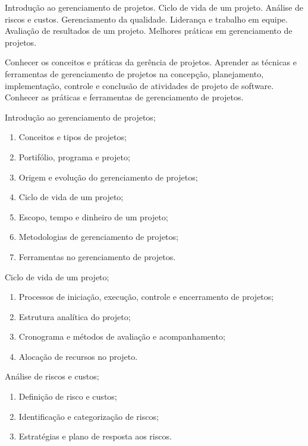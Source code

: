 \begin{pud}

	
	\ementa
	Introdução ao gerenciamento de projetos. Ciclo de vida de um projeto. Análise de riscos e custos. Gerenciamento da qualidade. Liderança e trabalho em equipe. Avaliação de resultados de um projeto. Melhores práticas em gerenciamento de projetos.
	
	\objetivos
	Conhecer os conceitos e práticas da gerência de projetos. Aprender as técnicas e ferramentas de gerenciamento de projetos na concepção, planejamento, implementação, controle e conclusão de atividades de projeto de software.  Conhecer as práticas e ferramentas de gerenciamento de projetos.
	
	
	\programa
	\begin{description}[itemsep=0em]
		\item[UNIDADE I:] Introdução ao gerenciamento de projetos;
		\begin{enumerate}[itemsep=0em, topsep=0em]
			\item Conceitos e tipos de projetos;
			\item Portifólio, programa e projeto;
			\item Origem e evolução do gerenciamento de projetos;
			\item Ciclo de vida de um projeto;
			\item Escopo, tempo e dinheiro de um projeto;
			\item Metodologias de gerenciamento de projetos;
			\item Ferramentas no gerenciamento de projetos.
		\end{enumerate}
		
	    \item[UNIDADE II:] Ciclo de vida de um projeto;
		\begin{enumerate}[itemsep=0em, topsep=0em]
			\item Processos de iniciação, execução, controle e encerramento de projetos;
			\item Estrutura analítica do projeto;
			\item Cronograma e métodos de avaliação e acompanhamento;
			\item Alocação de recursos no projeto.
		\end{enumerate}
		
        \item[UNIDADE III:] Análise de riscos e custos;
		\begin{enumerate}[itemsep=0em, topsep=0em]
			\item  Definição de risco e custos;
			\item  Identificação e categorização de riscos;
			\item  Estratégias e plano de resposta aos riscos.
		\end{enumerate}


\end{description}
\end{pud}
